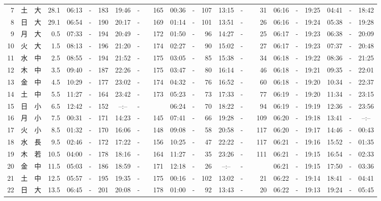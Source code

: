 \documentclass[12pt,a4j]{jsarticle}
\begin{document}
\begin{table}[htbp]
\begin{center}
{\begin{tabular}{|rc|cr|ccrccr|ccrccr|ccc|ccc|}
 7 & 土 & 大 & 28.1 &  06:13 &-& 183 &  19:46 &-& 165 &  00:36 &-& 107 &  13:15 &-&  31 & 06:16 & -& 19:25 & 04:41 & -& 18:42 \\
 8 & 日 & 大 & 29.1 &  06:54 &-& 190 &  20:17 &-& 169 &  01:14 &-& 101 &  13:51 &-&  26 & 06:16 & -& 19:24 & 05:38 & -& 19:28 \\
 9 & 月 & 大 &  0.5 &  07:33 &-& 194 &  20:49 &-& 172 &  01:50 &-&  96 &  14:27 &-&  25 & 06:17 & -& 19:23 & 06:38 & -& 20:09 \\
10 & 火 & 大 &  1.5 &  08:13 &-& 196 &  21:20 &-& 174 &  02:27 &-&  90 &  15:02 &-&  27 & 06:17 & -& 19:23 & 07:37 & -& 20:48 \\
11 & 水 & 中 &  2.5 &  08:55 &-& 194 &  21:52 &-& 175 &  03:05 &-&  85 &  15:38 &-&  34 & 06:18 & -& 19:22 & 08:36 & -& 21:25 \\
12 & 木 & 中 &  3.5 &  09:40 &-& 187 &  22:26 &-& 175 &  03:47 &-&  80 &  16:14 &-&  46 & 06:18 & -& 19:21 & 09:35 & -& 22:01 \\
13 & 金 & 中 &  4.5 &  10:29 &-& 177 &  23:02 &-& 174 &  04:32 &-&  76 &  16:52 &-&  60 & 06:18 & -& 19:20 & 10:34 & -& 22:37 \\
14 & 土 & 中 &  5.5 &  11:27 &-& 164 &  23:42 &-& 173 &  05:23 &-&  73 &  17:33 &-&  77 & 06:19 & -& 19:20 & 11:34 & -& 23:15 \\
15 & 日 & 小 &  6.5 &  12:42 &-& 152 &  --:-- &-&~~~~~ &  06:24 &-&  70 &  18:22 &-&  94 & 06:19 & -& 19:19 & 12:36 & -& 23:56 \\
16 & 月 & 小 &  7.5 &  00:31 &-& 171 &  14:23 &-& 145 &  07:41 &-&  66 &  19:28 &-& 109 & 06:20 & -& 19:18 & 13:41 & -& --:-- \\
17 & 火 & 小 &  8.5 &  01:32 &-& 170 &  16:06 &-& 148 &  09:08 &-&  58 &  20:58 &-& 117 & 06:20 & -& 19:17 & 14:46 & -& 00:43 \\
18 & 水 & 長 &  9.5 &  02:46 &-& 172 &  17:22 &-& 156 &  10:25 &-&  47 &  22:22 &-& 117 & 06:21 & -& 19:16 & 15:52 & -& 01:35 \\
19 & 木 & 若 & 10.5 &  04:00 &-& 178 &  18:16 &-& 164 &  11:27 &-&  35 &  23:26 &-& 111 & 06:21 & -& 19:15 & 16:54 & -& 02:33 \\
20 & 金 & 中 & 11.5 &  05:03 &-& 186 &  18:59 &-& 171 &  12:18 &-&  26 &  --:-- &-&~~~~~ & 06:21 & -& 19:15 & 17:50 & -& 03:36 \\
21 & 土 & 中 & 12.5 &  05:57 &-& 195 &  19:35 &-& 175 &  00:16 &-& 102 &  13:02 &-&  21 & 06:22 & -& 19:14 & 18:41 & -& 04:41 \\
22 & 日 & 大 & 13.5 &  06:45 &-& 201 &  20:08 &-& 178 &  01:00 &-&  92 &  13:43 &-&  20 & 06:22 & -& 19:13 & 19:24 & -& 05:45 \\

\end{tabular}}
\end{center}
\end{table}
\end{document}
